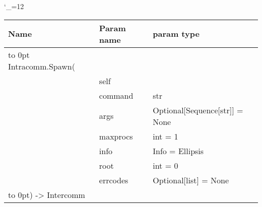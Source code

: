 \begingroup \catcode`\_=12 \tt
\begin{tabular}{lll}
\toprule
\textrm{Name}&\textrm{Param name}&\textrm{param type}\\
\midrule
\hbox to 0pt {Intracomm.Spawn(\hss}\\
& self\\
& command & str\\
& args & Optional[Sequence[str]] = None\\
& maxprocs & int = 1\\
& info & Info = Ellipsis\\
& root & int = 0\\
& errcodes & Optional[list] = None\\
\hbox to 0pt{) -> Intercomm\hss}\\
\bottomrule
\end{tabular}
\endgroup
